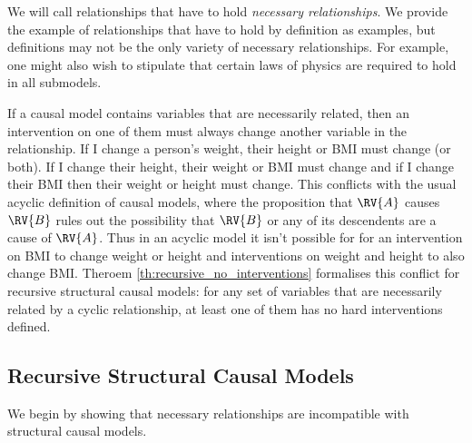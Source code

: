 We will call relationships that have to hold \emph{necessary relationships}. We provide the example of relationships that have to hold by definition as examples, but definitions may not be the only variety of necessary relationships. For example, one might also wish to stipulate that certain laws of physics are required to hold in all submodels.

If a causal model contains variables that are necessarily related, then an intervention on one of them must always change another variable in the relationship. If I change a person's weight, their height or BMI must change (or both). If I change their height, their weight or BMI must change and if I change their BMI then their weight or height must change. This conflicts with the usual acyclic definition of causal models, where the proposition that $\RV{A}$ causes $\RV{B}$ rules out the possibility that $\RV{B}$ or any of its descendents are a cause of $\RV{A}$. Thus in an acyclic model it isn't possible for for an intervention on BMI to change weight or height and interventions on weight and height to also change BMI. Theroem \ref{th:recursive_no_interventions} formalises this conflict for recursive structural causal models: for any set of variables that are necessarily related by a cyclic relationship, at least one of them has no hard interventions defined.

\subsection{Recursive Structural Causal Models}

We begin by showing that necessary relationships are incompatible with structural causal models.

